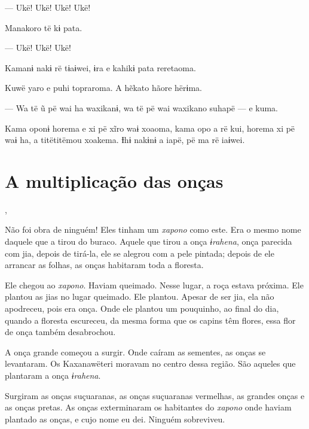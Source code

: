 --- Ukë! Ukë! Ukë! Ukë! 

Manakoro të kɨ pata. 

--- Ukë! Ukë! Ukë! 

Kamanɨ nakɨ rë tɨaɨwei, ɨra e kahikɨ pata reretaoma. 


Kuwë yaro e puhi topraroma. A hẽkato hãore hërɨma. 

--- Wa të ũ pë wai ha waxikanɨ, wa të pë wai waxikano suhapë --- e
kuma. 

Kama oponɨ horema e xi pë xĩro waɨ xoaoma, kama opo a rë kui, horema xi
pë waɨ ha, a titëtitëmou xoakema. Ɨhɨ nakɨnɨ a iapë, pë ma rë iaɨwei. 

 
\chapter{A multiplicação das onças}

, 

Não foi obra de ninguém! Eles tinham um \textit{xapono} como este. Era o mesmo nome
daquele que a tirou do buraco. Aquele que tirou a onça \textit{ɨrahena},
onça parecida com jia, depois de tirá-la, ele se alegrou com a pele
pintada; depois de ele arrancar as folhas, as onças habitaram toda a
floresta. 

Ele chegou ao \textit{xapono}. Haviam queimado. Nesse lugar, a roça estava
próxima. Ele plantou as jias no lugar queimado. Ele plantou. Apesar de
ser jia, ela não apodreceu, pois era onça. Onde ele plantou um pouquinho,
ao final do dia, quando a floresta escureceu, da mesma forma que os
capins têm flores, essa flor de onça também desabrochou. 

A onça grande começou a surgir. Onde caíram as sementes, as onças se
levantaram. Os Kaxanawëteri moravam no centro dessa região. São aqueles
que plantaram a onça \textit{ɨrahena}. 

Surgiram as onças suçuaranas, as onças suçuaranas vermelhas, as grandes
onças e as onças pretas. As onças exterminaram os habitantes do \textit{xapono}
onde haviam plantado as onças, e cujo nome eu dei. Ninguém sobreviveu. 


